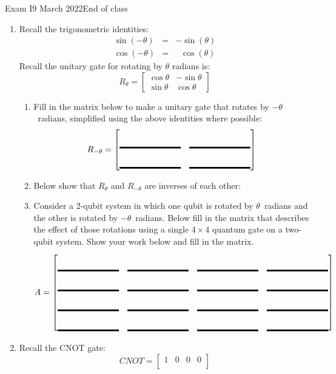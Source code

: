 \documentclass[12pt]{article}
\newcommand{\Blank}{\mbox{\vrule width 1in depth 2pt}\vrule width 0pt height 2.0em}
\begin{document}
\begin{assignment}{Exam I}{9 March 2022}{End of class}
\begin{enumerate}
\begin{enumerate}
  \item{} Can this be factored into the tensor product of two
qubits?\Blank{}
  \item{} Prove or disprove your claim below:
\LeaveSpace{2cm}
\end{enumerate}
\clearpage\item{}
Recall the trigonometric identities:
\begin{eqnarray*}
   \sin(-\theta) & = & -\sin(\theta) \\
   \cos(-\theta) & = & \ \ \,\cos(\theta)
\end{eqnarray*}
Recall the unitary gate for rotating by $\theta$ radians is:
\[
R_{\theta}=
\begin{bmatrix}
\cos{\theta} & -\sin{\theta} \\
\sin{\theta} & \cos{\theta}
\end{bmatrix}
\]
\begin{enumerate}
  \item{} Fill in the matrix below to make a unitary gate that
rotates by $-\theta$~radians, simplified using the above identities where
possible:
\[
R_{-\theta}=
\begin{bmatrix}
\Blank{} & \Blank{} \\
\Blank{} & \Blank{} 
\end{bmatrix}
\]
\item{} Below show that $R_\theta$ and $R_{-\theta}$ are inverses
of each other:
\LeaveSpace{2cm}
\item{} Consider a 2-qubit system in which one qubit is rotated by
$\theta$~radians and the other is rotated by $-\theta$~radians.
Below fill in the matrix that describes the effect of those rotations using
a single $4\times4$ quantum gate on a two-qubit system.  Show your work below and
fill in the matrix.
\LeaveSpace{4cm}
\[
A=
\begin{bmatrix}
\Blank{} & \Blank{} & \Blank{} & \Blank{}  \\
\Blank{} & \Blank{} & \Blank{} & \Blank{}  \\
\Blank{} & \Blank{} & \Blank{} & \Blank{}  \\
\Blank{} & \Blank{} & \Blank{} & \Blank{} 
\end{bmatrix}
\]
\end{enumerate}
\clearpage\item{}
Recall the CNOT gate:
\[
CNOT =
\begin{bmatrix}
1 & 0 & 0 & 0 \\

\end{bmatrix}\]
\end{enumerate}
\end{assignment}
\end{document}
